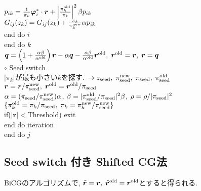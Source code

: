 \documentclass[12pt,titlepage]{jarticle}
\begin{document}
$p_{i k} = \frac{1}{\pi_k} {\boldsymbol \varphi}_i^* \cdot {\boldsymbol r} + 
\left|\frac{\pi^{\rm old}_k}{\pi_k } \right|^2 \beta p_{i k}$
\\\hspace{2.0cm}
$G_{i j}(z_k) = G_{i j}(z_k) + \frac{\pi_k}{\pi_k^{\rm new}} \alpha p_{i k}$
\\\hspace{1.5cm}
end do $i$
\\\hspace{1.0cm}
end do $k$
\\\hspace{1.0cm}
${\boldsymbol q} = \left( 1 + \frac{\alpha \beta}{\alpha^{\rm old}} \right) {\boldsymbol r}
- \alpha {\boldsymbol q} - \frac{\alpha \beta}{\alpha^{\rm old}} {\boldsymbol r}^{\rm old},\; 
{\boldsymbol r}^{\rm old} = {\boldsymbol r},\; {\boldsymbol r} = {\boldsymbol q}$
\\\hspace{1.0cm}
$\circ$ Seed switch
\\\hspace{1.0cm}
$|\pi_k|$が最も小さい$k$を探す. 
$\rightarrow z_{\rm seed},\; \pi_{\rm seed}^{\rm new},\; \pi_{\rm seed},\; \pi_{\rm seed}^{\rm old} $
\\\hspace{1.0cm}
${\boldsymbol r} = {\boldsymbol r} / \pi_{\rm seed}^{\rm new},\; 
{\boldsymbol r}^{\rm old} = {\boldsymbol r}^{\rm old} / \pi_{\rm seed}$
\\\hspace{1.0cm}
$\alpha = (\pi_{\rm seed} / \pi_{\rm seed}^{\rm new}) \alpha$,
$\beta = |\pi_{\rm seed}^{\rm old} / \pi_{\rm seed}|^2 \beta$,
$\rho = \rho / |\pi_{\rm seed}|^2$
\\\hspace{1.0cm}
$\{\pi_k^{\rm old} = \pi_k/\pi_{\rm seed},\; \pi_k = \pi_k^{\rm new} / \pi_{\rm seed}^{\rm new}\}$
\\\hspace{1.0cm}
if($|{\boldsymbol r}| < $Threshold) exit
\\\hspace{0.5cm}
end do iteration
\\
end do $j$

\subsection{Seed switch 付き Shifted CG法}

BiCGのアルゴリズムで, ${\tilde {\boldsymbol r}} = {\boldsymbol r},\; 
{\tilde {\boldsymbol r}}^{\rm old} = {\boldsymbol r}^{\rm old}$とすると得られる.
\end{document}
